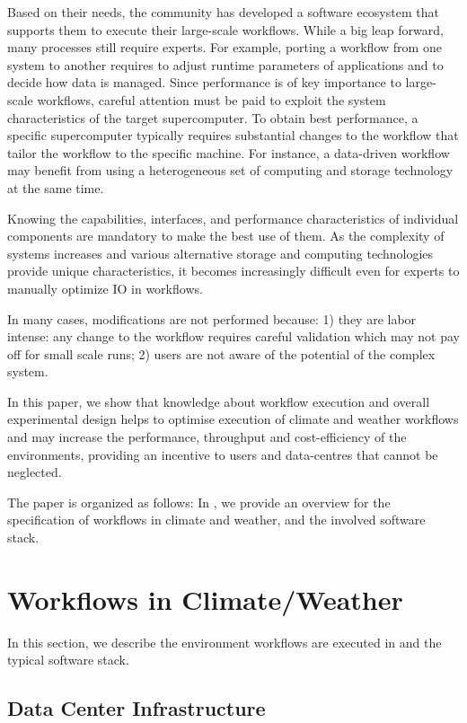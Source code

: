 \documentclass[a4paper]{article}
\newcommand{\jk}[1]{\todo[inline]{JK: #1}}
\begin{document}
{{Based on their needs, the community has developed a software ecosystem that supports them to execute their large-scale workflows.
While a big leap forward, many processes still require experts.
For example, porting a workflow from one system to another requires to adjust runtime parameters of applications and to decide how data is managed.
Since performance is of key importance to large-scale workflows, careful attention must be paid to exploit the system characteristics of the target supercomputer.
To obtain best performance, a specific supercomputer typically requires substantial changes to the workflow that tailor the workflow to the specific machine.
For instance, a data-driven workflow may benefit from using a heterogeneous set of computing and storage technology at the same time.

Knowing the capabilities, interfaces, and performance characteristics of individual components are mandatory to make the best use of them.
As the complexity of systems increases and various alternative storage and computing technologies provide unique characteristics, it becomes increasingly difficult even for experts to manually optimize IO in workflows.

In many cases, modifications are not performed because: 1) they are labor intense: any change to the workflow requires careful validation which may not pay off for small scale runs; 2) users are not aware of the potential of the complex system.

In this paper, we show that knowledge about workflow execution and overall experimental design helps to
optimise execution of climate and weather workflows and may increase the performance, throughput and cost-efficiency of the environments, providing an incentive to users and data-centres that cannot be neglected.

The paper is organized as follows:
In , we provide an overview for the specification of workflows in climate and weather, and the involved software stack.

\jk{TODO}


\section{Workflows in Climate/Weather}
\label{sec:workflows}

In this section, we describe the environment workflows are executed in and the typical software stack.

\subsection{Data Center Infrastructure}

}}
\end{document}
